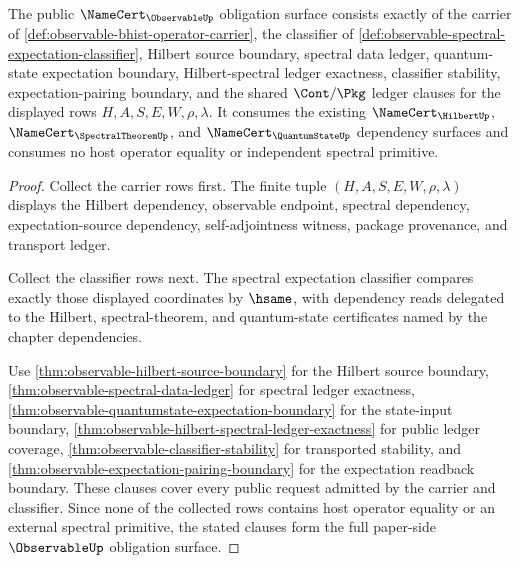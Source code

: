 \begin{theorem}
\label{thm:observable-namecert-obligation-surface}
The public $\NameCert_{\ObservableUp}$ obligation surface consists exactly of
the carrier of \autoref{def:observable-bhist-operator-carrier}, the
classifier of \autoref{def:observable-spectral-expectation-classifier},
Hilbert source boundary, spectral data ledger, quantum-state expectation
boundary, Hilbert-spectral ledger exactness, classifier stability,
expectation-pairing boundary, and the shared $\Cont/\Pkg$ ledger clauses for
the displayed rows $H,A,S,E,W,\rho,\lambda$. It consumes the existing
$\NameCert_{\HilbertUp}$, $\NameCert_{\SpectralTheoremUp}$, and
$\NameCert_{\QuantumStateUp}$ dependency surfaces and consumes no host
operator equality or independent spectral primitive.
\end{theorem}
\begin{proof}
Collect the carrier rows first. The finite tuple
$(H,A,S,E,W,\rho,\lambda)$ displays the Hilbert dependency, observable
endpoint, spectral dependency, expectation-source dependency,
self-adjointness witness, package provenance, and transport ledger.

Collect the classifier rows next. The spectral expectation classifier
compares exactly those displayed coordinates by $\hsame$, with dependency
reads delegated to the Hilbert, spectral-theorem, and quantum-state
certificates named by the chapter dependencies.

Use \autoref{thm:observable-hilbert-source-boundary} for the Hilbert source
boundary, \autoref{thm:observable-spectral-data-ledger} for spectral ledger
exactness, \autoref{thm:observable-quantumstate-expectation-boundary} for the
state-input boundary, \autoref{thm:observable-hilbert-spectral-ledger-exactness}
for public ledger coverage, \autoref{thm:observable-classifier-stability} for
transported stability, and
\autoref{thm:observable-expectation-pairing-boundary} for the expectation
readback boundary. These clauses cover every public request admitted by the
carrier and classifier. Since none of the collected rows contains host
operator equality or an external spectral primitive, the stated clauses form
the full paper-side $\ObservableUp$ obligation surface.
\end{proof}

